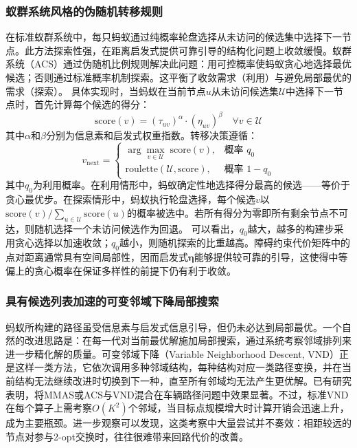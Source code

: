 \documentclass[lettersize,journal]{IEEEtran}
\begin{document}
\subsubsection{蚁群系统风格的伪随机转移规则}
在标准蚁群系统中，每只蚂蚁通过纯概率轮盘选择从未访问的候选集中选择下一节点。此方法探索性强，在距离启发式提供可靠引导的结构化问题上收敛缓慢。蚁群系统（ACS）\cite{ref22}通过伪随机比例规则解决此问题：用可控概率使蚂蚁贪心地选择最优候选；否则通过标准概率机制探索。这平衡了收敛需求（利用）与避免局部最优的需求（探索）。
具体实现时，当蚂蚁在当前节点$u$从未访问候选集$\mathcal{U}$中选择下一节点时，首先计算每个候选的得分：
\begin{equation}
\mathrm{score}(v) = (\tau_{uv})^{\alpha} \cdot (\eta_{uv})^{\beta} \quad \forall v \in \mathcal{U}
\label{eq:score}
\end{equation}
其中$\alpha$和$\beta$分别为信息素和启发式权重指数。转移决策遵循：
\begin{equation}
v_{\mathrm{next}} =
\begin{cases}
\arg\max_{v \in \mathcal{U}} \; \mathrm{score}(v), & \text{概率 } q_0 \\
\mathrm{roulette}(\mathcal{U}, \mathrm{score}), & \text{概率 } 1 - q_0
\end{cases}
\label{eq:trans}
\end{equation}
其中$q_0$为利用概率。在利用情形中，蚂蚁确定性地选择得分最高的候选——等价于贪心最优步。在探索情形中，蚂蚁执行轮盘选择，每个候选$v$以$\mathrm{score}(v) / \sum_{u \in \mathcal{U}} \mathrm{score}(u)$的概率被选中。若所有得分为零即所有剩余节点不可达，则随机选择一个未访问候选作为回退。
可以看出，$q_0$越大，越多的构建步采用贪心选择以加速收敛；$q_0$越小，则随机探索的比重越高。障碍约束代价矩阵中的点对距离通常具有空间局部性，因而启发式$\bm{\eta}$能够提供较可靠的引导，这使得中等偏上的贪心概率在保证多样性的前提下仍有利于收敛。
\subsubsection{具有候选列表加速的可变邻域下降局部搜索}
\label{subsec:vnd}
蚂蚁所构建的路径虽受信息素与启发式信息引导，但仍未必达到局部最优。一个自然的改进思路是：在每一代对当前最优解施加局部搜索，通过系统考察邻域排列来进一步精化解的质量。可变邻域下降（Variable Neighborhood Descent, VND）\cite{ref24}正是这样一类方法，它依次调用多种邻域结构，每种结构对应一类路径变换，并在当前结构无法继续改进时切换到下一种，直至所有邻域均无法产生更优解。已有研究表明，将MMAS或ACS与VND混合在车辆路径问题中效果显著\cite{ref25}。不过，标准VND在每个算子上需考察$O(K^2)$个邻域，当目标点规模增大时计算开销会迅速上升，成为主要瓶颈。进一步观察可以发现，这类考察中大量尝试并不奏效：相距较远的节点对参与2-opt交换时，往往很难带来回路代价的改善。
\end{document}
